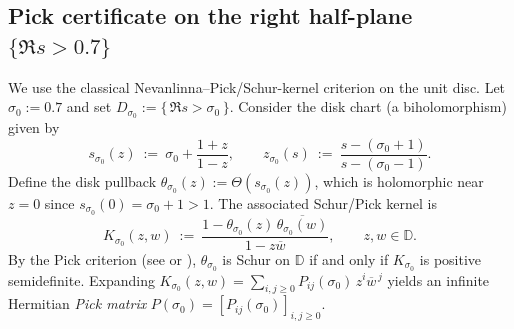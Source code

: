 \documentclass[11pt]{article}
\begin{document}
\subsection*{Pick certificate on the right half-plane \texorpdfstring{$\{\Re s>0.7\}$}{Re s>0.7}}
We use the classical Nevanlinna--Pick/Schur-kernel criterion on the unit disc.
Let $\sigma_0:=0.7$ and set $D_{\sigma_0}:=\{\,\Re s>\sigma_0\,\}$.
Consider the disk chart (a biholomorphism) given by
\[
  s_{\sigma_0}(z)\ :=\ \sigma_0+\frac{1+z}{1-z},
  \qquad
  z_{\sigma_0}(s)\ :=\ \frac{s-(\sigma_0+1)}{s-(\sigma_0-1)}.
\]
Define the disk pullback $\theta_{\sigma_0}(z):=\Theta(s_{\sigma_0}(z))$, which is holomorphic near $z=0$ since $s_{\sigma_0}(0)=\sigma_0+1>1$.
The associated Schur/Pick kernel is
\[
  K_{\sigma_0}(z,w)\ :=\ \frac{1-\theta_{\sigma_0}(z)\,\overline{\theta_{\sigma_0}(w)}}{1-z\overline w},
  \qquad z,w\in\mathbb D.
\]
By the Pick criterion (see \cite[Ch.~2]{RosenblumRovnyak} or \cite[Ch.~III]{Donoghue}), $\theta_{\sigma_0}$ is Schur on $\mathbb D$ if and only if $K_{\sigma_0}$ is positive semidefinite.
Expanding $K_{\sigma_0}(z,w)=\sum_{i,j\ge 0}P_{ij}(\sigma_0)\,z^i\overline w^{\,j}$ yields an infinite Hermitian \emph{Pick matrix} $P(\sigma_0)=[P_{ij}(\sigma_0)]_{i,j\ge 0}$.
\end{document}

